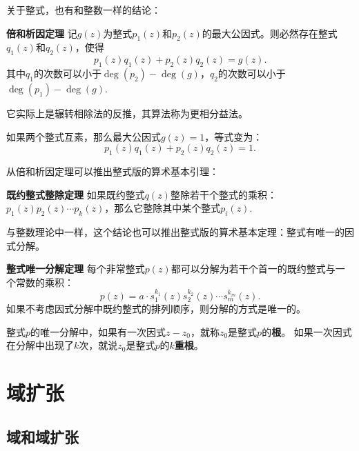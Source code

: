 \documentclass[12pt,UTF8,fontset=none]{ctexbook}
\begin{document}
\begin{appendix}
关于整式，也有和整数一样的结论：
\begin{pp}{\bfseries 倍和析因定理}\label{pp:0_1}
    记$g(z)$为整式$p_1(z)$和$p_2(z)$的最大公因式。则必然存在整式$q_1(z)$和$q_2(z)$，使得
    $$ p_1(z) q_1(z) + p_2(z) q_2(z) = g(z).$$
    其中$q_1$的次数可以小于$\deg(p_2) - \deg(g)$，$q_2$的次数可以小于$\deg(p_1) - \deg(g)$.
\end{pp} 
它实际上是辗转相除法的反推，其算法称为更相分益法。

如果两个整式互素，那么最大公因式$g(z)=1$，等式变为：
$$ p_1(z) q_1(z) + p_2(z) q_2(z) = 1.$$

从倍和析因定理可以推出整式版的算术基本引理：
\begin{pp}{\bfseries 既约整式整除定理}\label{pp:0_2}
    如果既约整式$q(z)$整除若干个整式的乘积：$p_1(z)p_2(z)\cdots p_k(z)$，那么它整除其中某个整式$p_i(z)$.
\end{pp} 
与整数理论中一样，这个结论也可以推出整式版的算术基本定理：整式有唯一的因式分解。
\begin{pp}{\bfseries 整式唯一分解定理}\label{pp:0_3}
    每个非常整式$p(z)$都可以分解为若干个首一的既约整式与一个常数的乘积：
    $$ p(z) = a\cdot s_1^{k_1}(z)s_2^{k_2}(z)\cdots s_m^{k_m}(z). $$
    如果不考虑因式分解中既约整式的排列顺序，则分解的方式是唯一的。
\end{pp} 

整式$p$的唯一分解中，如果有一次因式$z - z_0$，就称$z_0$是整式$p$的\textbf{根}。
如果一次因式在分解中出现了$k$次，就说$z_0$是整式$p$的$k$\textbf{重根}。

\chapter{域扩张}

\section{域和域扩张}

\end{appendix}
\end{document}
